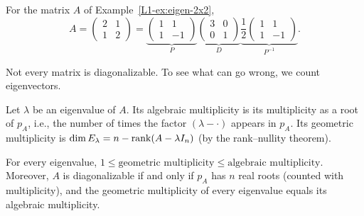 \begin{example}
    For the matrix $A$ of Example~\ref{L1-ex:eigen-2x2},
    \[A = \begin{pmatrix} 2 & 1 \\ 1 & 2 \end{pmatrix} = \underbrace{\begin{pmatrix} 1 & 1 \\ 1 & -1 \end{pmatrix}}_{P} \underbrace{\begin{pmatrix} 3 & 0 \\ 0 & 1 \end{pmatrix}}_{D} \underbrace{\frac{1}{2}\begin{pmatrix} 1 & 1 \\ 1 & -1 \end{pmatrix}}_{P^{-1}}.\]
\end{example}

Not every matrix is diagonalizable. To see what can go wrong, we count eigenvectors.

\begin{definition}[Multiplicities]
    Let $\lambda$ be an eigenvalue of $A$. Its algebraic multiplicity is its multiplicity as a root of $p_A$, i.e., the number of times the factor $(\lambda - \cdot)$ appears in $p_A$. Its geometric multiplicity is $\dim E_\lambda = n - \operatorname{rank}(A - \lambda I_n)$ (by the rank--nullity theorem).
\end{definition}

\begin{theorem}\label{L1-thm:multiplicities}
    For every eigenvalue, $1 \leq \text{geometric multiplicity} \leq \text{algebraic multiplicity}$. Moreover, $A$ is diagonalizable if and only if $p_A$ has $n$ real roots (counted with multiplicity), and the geometric multiplicity of every eigenvalue equals its algebraic multiplicity.
\end{theorem}

